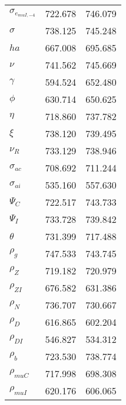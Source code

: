 \begin{center}
\begin{longtable}{lcc}
$ \sigma_{{e_{muI,-4}}}   $	 & 	     722.678	 & 	     746.079 \\ 
$ {\sigma}                $	 & 	     738.125	 & 	     745.248 \\ 
$ {ha}                    $	 & 	     667.008	 & 	     695.685 \\ 
$ \nu                     $	 & 	     741.562	 & 	     745.669 \\ 
$ \gamma                  $	 & 	     594.524	 & 	     652.480 \\ 
$ {\phi}                  $	 & 	     630.714	 & 	     650.625 \\ 
$ {\eta}                  $	 & 	     718.860	 & 	     737.782 \\ 
$ \xi                     $	 & 	     738.120	 & 	     739.495 \\ 
$ {\nu_R}                 $	 & 	     733.129	 & 	     738.946 \\ 
$ {\sigma_{ac}}           $	 & 	     708.692	 & 	     711.244 \\ 
$ {\sigma_{ai}}           $	 & 	     535.160	 & 	     557.630 \\ 
$ {\Psi_{C}}              $	 & 	     722.517	 & 	     743.733 \\ 
$ {\Psi_I}                $	 & 	     733.728	 & 	     739.842 \\ 
$ {\theta}                $	 & 	     731.399	 & 	     717.488 \\ 
$ {\rho_g}                $	 & 	     747.533	 & 	     743.745 \\ 
$ {\rho_Z}                $	 & 	     719.182	 & 	     720.979 \\ 
$ {\rho_{ZI}}             $	 & 	     676.582	 & 	     631.386 \\ 
$ {\rho_N}                $	 & 	     736.707	 & 	     730.667 \\ 
$ {\rho_D}                $	 & 	     616.865	 & 	     602.204 \\ 
$ {\rho_{DI}}             $	 & 	     546.827	 & 	     534.312 \\ 
$ {\rho_b}                $	 & 	     723.530	 & 	     738.774 \\ 
$ {\rho_{muC}}            $	 & 	     717.998	 & 	     698.308 \\ 
$ {\rho_{muI}}            $	 & 	     620.176	 & 	     606.065 \\ 
\end{longtable}
 \end{center}
